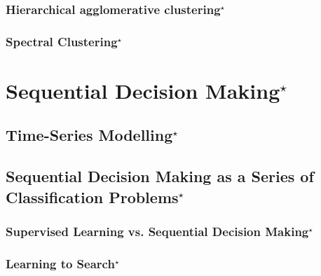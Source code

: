 \documentclass{report}
\newcommand{\todo}[1]{{\Large\textcolor{red}{#1}}}
\begin{document}
\subsection{Hierarchical agglomerative clustering$^\star$}

\subsection{Spectral Clustering$^\star$}


\chapter{Sequential Decision Making$^\star$}

\section{Time-Series Modelling$^\star$}
\label{sec:timeseries}


\section{Sequential Decision Making as a Series of Classification
Problems$^\star$}

\subsection{Supervised Learning vs. Sequential Decision Making$^\star$}

\subsection{Learning to Search$^\star$}

\todo{}











\end{document}
